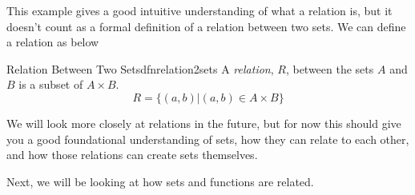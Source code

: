 This example gives a good intuitive understanding of what a relation is, but it doesn't count as a formal definition of a relation between two sets. We can define a relation as below

\begin{dfn}[label={def:relation2sets}]{Relation Between Two Sets}{dfnrelation2sets}
    A \emph{relation}, $R$, between the sets $A$ and $B$ is a subset of $A \times B$.
    $$R = \{(a,b) | (a,b) \in A \times B\}$$
\end{dfn}

We will look more closely at relations in the future, but for now this should give you a good foundational understanding of sets, how they can relate to each other, and how those relations can create sets themselves.

Next, we will be looking at how sets and functions are related.